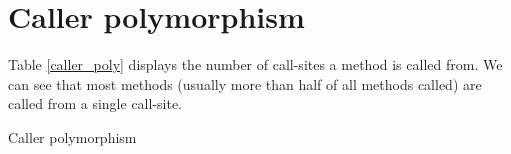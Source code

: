 \documentclass[10pt, sigplan, preprint]{acmart}
\begin{document}
\section{Caller polymorphism}

Table \ref{caller_poly} displays the number of call-sites a method is called from. We can see that most methods (usually more than half of all methods called) are called from a single call-site.

\begin{landscape}
\begin{table}[h!]
	\centering
	\tiny
	\resizebox{1.5\textwidth}{!}{
	\CallerPolymorphism
	}
	\caption{Caller polymorphism}
	\label{caller_poly}
\end{table}
\end{landscape}
\end{document}
